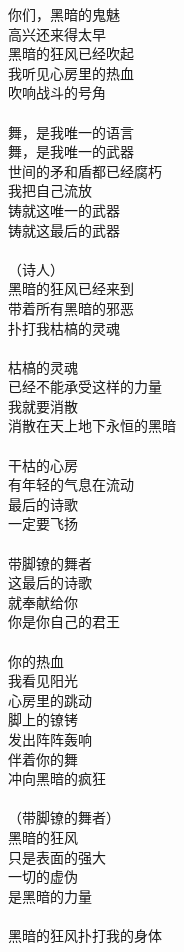 你们，黑暗的鬼魅\\
高兴还来得太早\\
黑暗的狂风已经吹起\\
我听见心房里的热血\\
吹响战斗的号角\\
\\
舞，是我唯一的语言\\
舞，是我唯一的武器\\
世间的矛和盾都已经腐朽\\
我把自己流放\\
铸就这唯一的武器\\
铸就这最后的武器\\
\\
（诗人）\\
黑暗的狂风已经来到\\
带着所有黑暗的邪恶\\
扑打我枯槁的灵魂\\
\\
枯槁的灵魂\\
已经不能承受这样的力量\\
我就要消散\\
消散在天上地下永恒的黑暗\\
\\
干枯的心房\\
有年轻的气息在流动\\
最后的诗歌\\
一定要飞扬\\
\\
带脚镣的舞者\\
这最后的诗歌\\
就奉献给你\\
你是你自己的君王\\
\\
你的热血\\
我看见阳光\\
心房里的跳动\\
脚上的镣铐\\
发出阵阵轰响\\
伴着你的舞\\
冲向黑暗的疯狂\\
\\
（带脚镣的舞者）\\
黑暗的狂风\\
只是表面的强大\\
一切的虚伪\\
是黑暗的力量\\
\\
黑暗的狂风扑打我的身体\\
